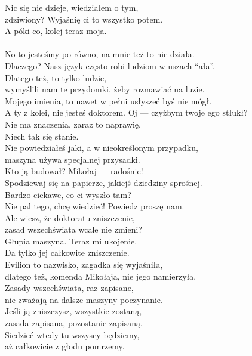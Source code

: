 \chardok{}
Nic się nie dzieje, wiedziałem o tym,\\
zdziwiony? Wyjaśnię ci to wszystko potem.\\
A póki co, kolej teraz moja.\\
\\

\charfer{}
No to jesteśmy po równo, na mnie też to nie działa.\\
Dlaczego? Nasz język często robi ludziom w uszach "`ała"'.\\
Dlatego też, to tylko ludzie,\\
wymyślili nam te przydomki, żeby rozmawiać na luzie.\\
Mojego imienia, to nawet w pełni usłyszeć byś nie mógł.\\
A ty z kolei, nie jesteś doktorem. Oj --- czyżbym twoje ego stłukł?\\

\chardok{}
Nie ma znaczenia, zaraz to naprawię.\\
 Niech tak się stanie.\\

\charfer{}
Nie powiedziałeś jaki, a w nieokreślonym przypadku,\\
maszyna używa specjalnej przysadki.\\
Kto ją budował? Mikołaj --- radośnie!\\
Spodziewaj się na papierze, jakiejś dziedziny sprośnej.\\
Bardzo ciekawe, co ci wyszło tam?\\
Nie pal tego, chcę wiedzieć! Powiedz proszę nam.\\
Ale wiesz, że doktoratu zniszczenie,\\
zasad wszechświata wcale nie zmieni?\\

\charszam{}
Głupia maszyna. Teraz mi ukojenie.\\
Da tylko jej całkowite zniszczenie.\\

\charfer{}
Evilion to nazwisko, zagadka się wyjaśniła,\\
dlatego też, komenda Mikołaja, nie jego namierzyła.\\
Zasady wszechświata, raz zapisane,\\
nie zważają na dalsze maszyny poczynanie.\\
Jeśli ją zniszczysz, wszystkie zostaną,\\
zasada zapisana, pozostanie zapisaną.\\
Siedzieć wtedy tu wszyscy będziemy,\\
aż całkowicie z głodu pomrzemy.\\

